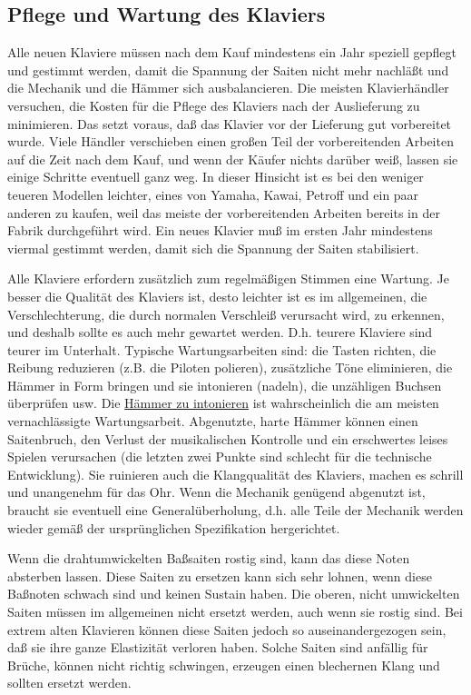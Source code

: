\subsection{Pflege und Wartung des Klaviers}
\label{c1iii17f}

Alle neuen Klaviere müssen nach dem Kauf mindestens ein Jahr speziell gepflegt und gestimmt werden, damit die Spannung der Saiten nicht mehr nachläßt und die Mechanik und die Hämmer sich ausbalancieren.
Die meisten Klavierhändler versuchen, die Kosten für die Pflege des Klaviers nach der Auslieferung zu minimieren.
Das setzt voraus, daß das Klavier vor der Lieferung gut vorbereitet wurde.
Viele Händler verschieben einen großen Teil der vorbereitenden Arbeiten auf die Zeit nach dem Kauf, und wenn der Käufer nichts darüber weiß, lassen sie einige Schritte eventuell ganz weg.
In dieser Hinsicht ist es bei den weniger teueren Modellen leichter, eines von Yamaha, Kawai, Petroff und ein paar anderen zu kaufen, weil das meiste der vorbereitenden Arbeiten bereits in der Fabrik durchgeführt wird.
Ein neues Klavier muß im ersten Jahr mindestens viermal gestimmt werden, damit sich die Spannung der Saiten stabilisiert.

Alle Klaviere erfordern zusätzlich zum regelmäßigen Stimmen eine Wartung.
Je besser die Qualität des Klaviers ist, desto leichter ist es im allgemeinen, die Verschlechterung, die durch normalen Verschleiß verursacht wird, zu erkennen, und deshalb sollte es auch mehr gewartet werden.
D.h. teurere Klaviere sind teurer im Unterhalt.
Typische Wartungsarbeiten sind: die Tasten richten, die Reibung reduzieren (z.B. die Piloten polieren), zusätzliche Töne eliminieren, die Hämmer in Form bringen und sie intonieren (nadeln), die unzähligen Buchsen überprüfen usw.
Die \hyperref[c2_7_hamm]{Hämmer zu intonieren} ist wahrscheinlich die am meisten vernachlässigte Wartungsarbeit.
Abgenutzte, harte Hämmer können einen Saitenbruch, den Verlust der musikalischen Kontrolle und ein erschwertes leises Spielen verursachen (die letzten zwei Punkte sind schlecht für die technische Entwicklung).
Sie ruinieren auch die Klangqualität des Klaviers, machen es schrill und unangenehm für das Ohr.
Wenn die Mechanik genügend abgenutzt ist, braucht sie eventuell eine Generalüberholung, d.h. alle Teile der Mechanik werden wieder gemäß der ursprünglichen Spezifikation hergerichtet.

Wenn die drahtumwickelten Baßsaiten rostig sind, kann das diese Noten absterben lassen.
Diese Saiten zu ersetzen kann sich sehr lohnen, wenn diese Baßnoten schwach sind und keinen Sustain haben.
Die oberen, nicht umwickelten Saiten müssen im allgemeinen nicht ersetzt werden, auch wenn sie rostig sind.
Bei extrem alten Klavieren können diese Saiten jedoch so auseinandergezogen sein, daß sie ihre ganze Elastizität verloren haben.
Solche Saiten sind anfällig für Brüche, können nicht richtig schwingen, erzeugen einen blechernen Klang und sollten ersetzt werden.

